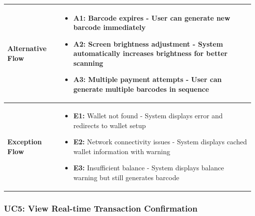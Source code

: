\begin{longtable}{|p{3cm}|p{11cm}|}
\hline
\textbf{Alternative Flow} & 
\begin{itemize}[nosep,leftmargin=*]
\item \textbf{A1:} Barcode expires - User can generate new barcode immediately
\item \textbf{A2:} Screen brightness adjustment - System automatically increases brightness for better scanning
\item \textbf{A3:} Multiple payment attempts - User can generate multiple barcodes in sequence
\end{itemize} \\
\hline
\textbf{Exception Flow} & 
\begin{itemize}[nosep,leftmargin=*]
\item \textbf{E1:} Wallet not found - System displays error and redirects to wallet setup
\item \textbf{E2:} Network connectivity issues - System displays cached wallet information with warning
\item \textbf{E3:} Insufficient balance - System displays balance warning but still generates barcode
\end{itemize} \\
\hline
\end{longtable}

\subsubsection{UC5: View Real-time Transaction Confirmation}

